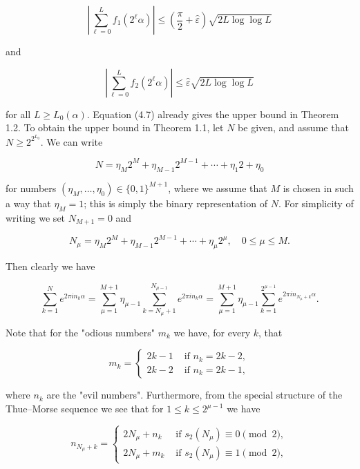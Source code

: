 \documentclass[10pt]{article}
\newcommand{\1}{\mathbf{1}}
\begin{document}
\begin{equation*}
\left|\sum_{\ell=0}^{L} f_{1}\left(2^{\ell} \alpha\right)\right| \leqslant\left(\frac{\pi}{2}+\hat{\varepsilon}\right) \sqrt{2 L \log \log L} \tag{4.7}
\end{equation*}


and


\begin{equation*}
\left|\sum_{\ell=0}^{L} f_{2}\left(2^{\ell} \alpha\right)\right| \leqslant \hat{\varepsilon} \sqrt{2 L \log \log L} \tag{4.8}
\end{equation*}


for all $L \geqslant L_{0}(\alpha)$. Equation (4.7) already gives the upper bound in Theorem 1.2. To obtain the upper bound in Theorem 1.1, let $N$ be given, and assume that $N\geqslant 2^{2^{L_0}}$. We can write

$$
N=\eta_{M} 2^{M}+\eta_{M-1} 2^{M-1}+\cdots+\eta_{1} 2+\eta_{0}
$$

for numbers $\left(\eta_{M}, \ldots, \eta_{0}\right) \in\{0,1\}^{M+1}$, where we assume that $M$ is chosen in such a way that $\eta_{M}=1$; this is simply the binary representation of $N$. For simplicity of writing we set $N_{M+1}=0$ and

$$
N_{\mu}=\eta_{M} 2^{M}+\eta_{M-1} 2^{M-1}+\cdots+\eta_{\mu} 2^{\mu}, \quad 0 \leqslant \mu \leqslant M .
$$

Then clearly we have


\begin{equation*}
\sum_{k=1}^{N} e^{2 \pi i n_{k} \alpha}=\sum_{\mu=1}^{M+1} \eta_{\mu-1} \sum_{k=N_{\mu}+1}^{N_{\mu-1}} e^{2 \pi i n_{k} \alpha}=\sum_{\mu=1}^{M+1} \eta_{\mu-1} \sum_{k=1}^{2^{\mu-1}} e^{2 \pi i n_{N_{\mu}+k} \alpha} . \tag{4.9}
\end{equation*}


Note that for the "odious numbers" $m_{k}$ we have, for every $k$, that

$$
m_{k}= \begin{cases}2 k-1 & \text{ if } n_{k}=2 k-2, \\ 2 k-2 & \text{ if } n_{k}=2 k-1,\end{cases}
$$

where $n_{k}$ are the "evil numbers". Furthermore, from the special structure of the Thue--Morse sequence we see that for $1 \leqslant k \leqslant 2^{\mu-1}$ we have

\[
n_{N_{\mu}+k}= \begin{cases}2 N_{\mu}+n_{k} & \text{ if }s_2(N_\mu)\equiv0\pmod 2,  \tag{4.10}\\ 2 N_{\mu}+m_{k} & \text{ if }s_2(N_\mu)\equiv1\pmod 2,\end{cases}
\]
\end{document}
